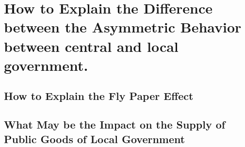 \chapter{How to Explain  the Difference between the Asymmetric Behavior between central and local government.}

\section{How to Explain the Fly Paper Effect}


\section{What May be the Impact on the Supply of Public Goods of Local Government}
